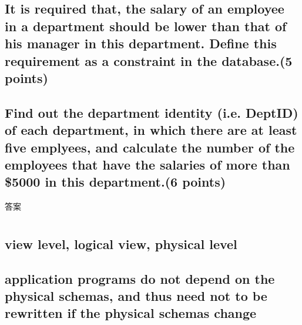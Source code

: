\documentclass{ctexart}
\begin{document}
\subsection{It is required that, the salary of an employee in a department should be lower than that of his manager in this department. Define this requirement as a constraint in the database.\quad(5 points)}
\subsection{Find out the department identity (i.e. DeptID) of each department, in which there are at least five emplyees, and calculate the number of the employees that have the salaries of more than \$5000 in this department.\quad(6 points)}
\newpage
\begin{center}
    \LARGE\sffamily 答案
\end{center}
\setcounter{section}{0}
\section{}
\subsection{view level, logical view, physical level}
\subsection{application programs do not depend on the physical schemas, and thus need not to be rewritten if the physical schemas change}
\end{document}
